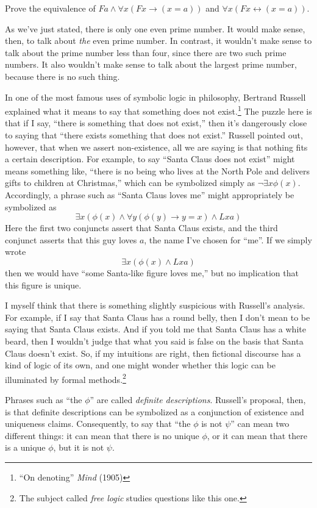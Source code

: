 \begin{exercise} Prove the equivalence of
  $Fa\wedge\forall x(Fx\to (x=a))$ and
  $\forall x(Fx\leftrightarrow (x=a))$. \end{exercise}

As we've just stated, there is only one even prime number. It would
make sense, then, to talk about {\it the} even prime number.  In
contrast, it wouldn't make sense to talk about the prime number less
than four, since there are two such prime numbers.  It also wouldn't
make sense to talk about the largest prime number, because there is no
such thing.

In one of the most famous uses of symbolic logic in philosophy,
Bertrand Russell explained what it means to say that something does
not exist.\footnote{``On denoting'' \textit{Mind} (1905)} The puzzle
here is that if I say, ``there is something that does not exist,''
then it's dangerously close to saying that ``there exists something
that does not exist.''  Russell pointed out, however, that when we
assert non-existence, all we are saying is that nothing fits a
certain description.  For example, to say ``Santa Claus does not exist''
might means something like, ``there is no being who lives at the North
Pole and delivers gifts to children at Christmas,'' which can be symbolized
simply as $\neg\exists x\phi (x)$.  Accordingly,
a phrase such as ``Santa Claus loves me'' might appropriately be symbolized as
\[ \exists x(\phi (x)\wedge \forall y(\phi (y)\to y=x)\wedge Lxa) \]
Here the first two conjuncts assert that Santa Claus exists, and
the third conjunct asserts that this guy loves $a$, the name I've
chosen for ``me''.  If we simply wrote
\[ \exists x(\phi (x)\wedge Lxa) \] then we would have ``some
Santa-like figure loves me,'' but no implication that this figure is
unique.

I myself think that there is something slightly suspicious with
Russell's analysis.  For example, if I say that Santa Claus has a
round belly, then I don't mean to be saying that Santa Claus exists.
And if you told me that Santa Claus has a white beard, then I wouldn't
judge that what you said is false on the basis that Santa Claus
doesn't exist.  So, if my intuitions are right, then fictional
discourse has a kind of logic of its own, and one might wonder whether
this logic can be illuminated by formal methods.\footnote{The subject
  called \emph{free logic} studies questions like this one.}

Phrases such as ``the $\phi$'' are called \emph{definite
  descriptions}.  Russell's proposal, then, is that definite
descriptions can be symbolized as a conjunction of existence and
uniqueness claims.  Consequently, to say that ``the $\phi$ is not
$\psi$'' can mean two different things: it can mean that there is no
unique $\phi$, or it can mean that there is a unique $\phi$, but it is
not $\psi$.
                                                             
